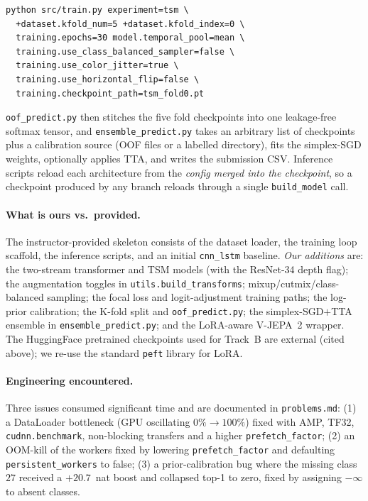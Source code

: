 \documentclass[10pt,twocolumn,letterpaper]{article}
\begin{document}
\begin{verbatim}
python src/train.py experiment=tsm \
  +dataset.kfold_num=5 +dataset.kfold_index=0 \
  training.epochs=30 model.temporal_pool=mean \
  training.use_class_balanced_sampler=false \
  training.use_color_jitter=true \
  training.use_horizontal_flip=false \
  training.checkpoint_path=tsm_fold0.pt
\end{verbatim}

\texttt{oof\_predict.py} then stitches the five fold checkpoints into one
leakage-free softmax tensor, and \texttt{ensemble\_predict.py} takes an
arbitrary list of checkpoints plus a calibration source (OOF files or a
labelled directory), fits the simplex-SGD weights, optionally applies
TTA, and writes the submission CSV. Inference scripts reload each
architecture from the \emph{config merged into the checkpoint}, so a
checkpoint produced by any branch reloads through a single
\texttt{build\_model} call.

\paragraph{What is ours vs.~provided.} The instructor-provided skeleton
consists of the dataset loader, the training loop scaffold, the
inference scripts, and an initial \texttt{cnn\_lstm} baseline.
\emph{Our additions} are: the two-stream transformer and TSM models
(with the ResNet-34 depth flag); the augmentation toggles in
\texttt{utils.build\_transforms}; mixup/cutmix/class-balanced sampling;
the focal loss and logit-adjustment training paths; the log-prior
calibration; the K-fold split and \texttt{oof\_predict.py}; the
simplex-SGD$+$TTA ensemble in \texttt{ensemble\_predict.py}; and the
LoRA-aware V-JEPA~2 wrapper. The HuggingFace pretrained checkpoints used
for Track~B are external (cited above); we re-use the standard
\texttt{peft} library for LoRA.

\paragraph{Engineering encountered.} Three issues consumed significant
time and are documented in \texttt{problems.md}: (1) a DataLoader
bottleneck (GPU oscillating $0\%\!\rightarrow\!100\%$) fixed with AMP,
TF32, \texttt{cudnn.benchmark}, non-blocking transfers and a higher
\texttt{prefetch\_factor}; (2) an OOM-kill of the workers fixed by
lowering \texttt{prefetch\_factor} and defaulting
\texttt{persistent\_workers} to false; (3) a prior-calibration bug where
the missing class $27$ received a $+20.7$~nat boost and collapsed top-1
to zero, fixed by assigning $-\infty$ to absent classes.
\end{document}
